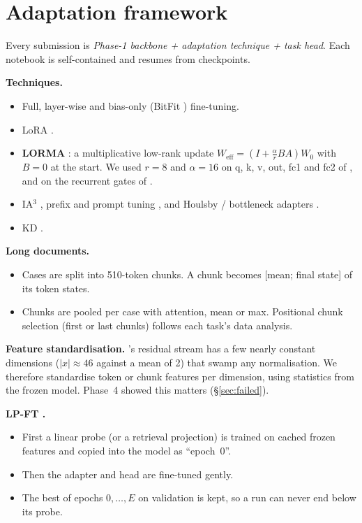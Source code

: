 \section{Adaptation framework}\label{sec:methods}
Every submission is \emph{Phase-1 backbone + adaptation technique + task head}. Each notebook is self-contained and resumes from checkpoints.

\textbf{Techniques.}
\begin{itemize}
\item Full, layer-wise and bias-only (BitFit \cite{bitfit}) fine-tuning.
\item LoRA \cite{lora}.
\item \textbf{LORMA} \cite{lorma}: a multiplicative low-rank update $W_{\text{eff}}=(I+\tfrac{\alpha}{r}BA)W_0$ with $B\!=\!0$ at the start. We used $r\!=\!8$ and $\alpha\!=\!16$ on q, k, v, out, fc1 and fc2 of \A{}, and on the recurrent gates of \C{}.
\item IA$^3$ \cite{ia3}, prefix \cite{prefix} and prompt tuning \cite{prompt}, and Houlsby / bottleneck adapters \cite{houlsby}.
\item KD \cite{hinton}.
\end{itemize}

\textbf{Long documents.}
\begin{itemize}
\item Cases are split into 510-token chunks. A chunk becomes [mean; final state] of its token states.
\item Chunks are pooled per case with attention, mean or max. Positional chunk selection (first or last chunks) follows each task's data analysis.
\end{itemize}

\textbf{Feature standardisation.} \A's residual stream has a few nearly constant dimensions ($|x|\!\approx\!46$ against a mean of 2) that swamp any normalisation. We therefore standardise token or chunk features per dimension, using statistics from the frozen model. Phase~4 showed this matters (\S\ref{sec:failed}).

\textbf{LP-FT \cite{lpft}.}
\begin{itemize}
\item First a linear probe (or a retrieval projection) is trained on cached frozen features and copied into the model as ``epoch~0''.
\item Then the adapter and head are fine-tuned gently.
\item The best of epochs $0,\dots,E$ on validation is kept, so a run can never end below its probe.
\end{itemize}

